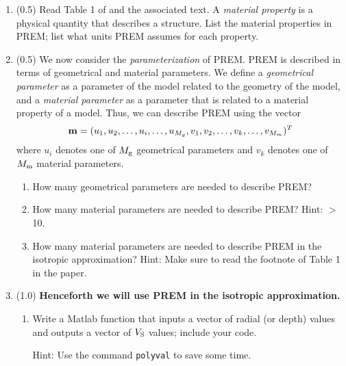 \documentclass[11pt,titlepage,fleqn]{article}
\begin{document}
\begin{enumerate}

\item (0.5) Read Table 1 of \citet{PREM} and the associated text. A {\em material property} is a physical quantity that describes a structure. List the material properties in PREM; list what units PREM assumes for each property.


\item (0.5) We now consider the {\em parameterization} of PREM. PREM is described in terms of geometrical and material parameters. We define a {\em geometrical parameter} as a parameter of the model related to the geometry of the model, and a {\em material parameter} as a parameter that is related to a material property of a model. Thus, we can describe PREM using the vector
%
\begin{equation}
\mbox{${\bf m}$} = (u_1, u_2, \ldots, u_i, \ldots, u_{M_g}, v_1, v_2, \ldots, v_k, \ldots, v_{M_m})^T
\end{equation}
%
where $u_i$ denotes one of $M_{\rm g}$ geometrical parameters and $v_k$ denotes one of $M_{\rm m}$ material parameters.

\begin{enumerate}
\item How many geometrical parameters are needed to describe PREM?
\item How many material parameters are needed to describe PREM? Hint: $>$10.
\item How many material parameters are needed to describe PREM in the isotropic approximation? Hint: Make sure to read the footnote of Table 1 in the paper.
\end{enumerate}


\pagebreak

\item (1.0) {\bf Henceforth we will use PREM in the isotropic approximation.}


\begin{enumerate}
\item Write a Matlab function that inputs a vector of radial (or depth) values and outputs a vector of $V_{\rm S}$ values; include your code.

Hint: Use the command \verb+polyval+ to save some time.


\end{enumerate}
\end{enumerate}
\end{document}
